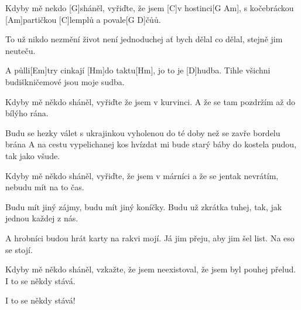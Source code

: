 
Kdyby mě nekdo [G]sháněl,
vyřiďte, že jsem [C]v hostinci[G Am],
s kočebráckou [Am]partičkou
[C]lemplů a povale[G D]\null čůů.

To už nikdo nezmění
život není jednoduchej
ať bych dělal co dělal,
stejně jim neuteču.

A půlli[Em]try
cinkají [Hm]do taktu[Hm],
jo to je [D]hudba.
Tihle všichni
budiškničemové
jsou moje sudba.

Kdyby mě někdo sháněl,
vyřiďte že jsem v kurvinci.
A že se tam pozdržím
až do bílýho rána.

Budu se hezky válet
s ukrajinkou vyholenou
do té doby než se
zavře bordelu brána
\slpc
A na cestu
vypelichanej kos
hvízdat mi bude
starý báby
do kostela pudou,
tak jako všude.

Kdyby mě někdo sháněl,
vyřiďte, že jsem v márníci
a že se jentak nevrátím,
nebudu mít na to čas.

Budu mít jiný zájmy,
budu mít jiný koníčky.
Budu už zkrátka tuhej,
tak, jak jednou každej z nás.

A hrobníci
budou hrát karty
na rakvi mojí.
Já jim přeju,
aby jim šel list.
Na eso se stojí.

Kdyby mě někdo sháněl,
vzkažte, že jsem neexistoval,
že jsem byl pouhej přelud.
I to se někdy stává.

I to se někdy stává!
